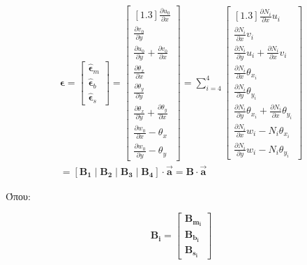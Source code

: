 \begin{multline}
\boldsymbol{\epsilon} = \begin{bmatrix}
{\hat{\boldsymbol{\epsilon}}}_{m} \\
{\hat{\boldsymbol{\epsilon}}}_{b} \\
{\hat{\boldsymbol{\epsilon}}}_{s}
\end{bmatrix} = \begin{bmatrix}[1.3]
\frac{\partial u_{0}}{\partial x} \\
\frac{\partial v_{0}}{\partial y} \\
\frac{\partial u_{0}}{\partial y} + \frac{\partial v_{0}}{\partial x} \\
\frac{\partial\theta_{x}}{\partial x} \\
\frac{\partial\theta_{y}}{\partial y} \\
\frac{\partial\theta_{x}}{\partial y} + \frac{\partial\theta_{y}}{\partial x} \\
\frac{\partial w_{0}}{\partial x} - \theta_{x} \\
\frac{\partial w_{0}}{\partial y} - \theta_{y}
\end{bmatrix} = \sum_{i = 4}^{4}\begin{bmatrix}[1.3]
\frac{\partial N_{i}}{\partial x}u_{i} \\
\frac{\partial N_{i}}{\partial x}v_{i} \\
\frac{\partial N_{i}}{\partial y}u_{i} + \frac{\partial N_{i}}{\partial x}v_{i} \\
\frac{\partial N_{i}}{\partial x}\theta_{x_{i}} \\
\frac{\partial N_{i}}{\partial y}\theta_{y_{i}} \\
\frac{\partial N_{i}}{\partial y}\theta_{x_{i}} + \frac{\partial N_{i}}{\partial x}\theta_{y_{i}} \\
\frac{\partial N_{i}}{\partial x}w_{i} - N_{i}\theta_{x_{i}} \\
\frac{\partial N_{i}}{\partial y}w_{i} - N_{i}\theta_{y_{i}}
\end{bmatrix}\\
= \left\lbrack \mathbf{B_1}\mid\mathbf{B_2}\mid\mathbf{B_3}\mid \mathbf{B_4}\right\rbrack \cdot \vec{\mathbf{a}} = \mathbf{B} \cdot \vec{\mathbf{a}}
\end{multline}


Όπου:

\[\mathbf{B}_{\mathbf{i}}=\begin{bmatrix}
\mathbf{B}_{\mathbf{m}_{\mathbf{i}}} \\
\mathbf{B}_{\mathbf{b}_{\mathbf{i}}} \\
\mathbf{B}_{\mathbf{s}_{\mathbf{i}}}
\end{bmatrix}\]


